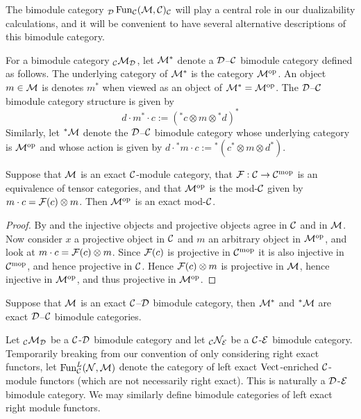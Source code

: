 \documentclass{amsart}
\begin{document}
The bimodule category ${}_\mathcal D \operatorname{Fun}_\mathcal C(\mathcal M,\mathcal C)_\mathcal C$ will play a central role in our dualizability calculations, and it will be convenient to have several alternative descriptions of this bimodule category.

\begin{definition} \label{def:Dual_bimodule_notation}
For a bimodule category ${}_\mathcal C \mathcal M_\mathcal D$, let $\mathcal M^*$ denote a $\mathcal D$--$\mathcal C$ bimodule category defined as follows.  The underlying category of $\mathcal M^*$ is the category $\mathcal M^{\mathrm{op}}$. An object $m \in \mathcal M$ is denotes $m^*$ when viewed as an object of $\mathcal M^* = \mathcal M^{\mathrm{op}}$.  The $\mathcal D$--$\mathcal C$ bimodule category structure is given by
\begin{equation*}
	d\cdot m^* \cdot c := ({}^*c \otimes m \otimes {}^*d)^*
\end{equation*}
Similarly, let ${}^*\mathcal M$ denote the $\mathcal D$--$\mathcal C$ bimodule category whose underlying category is $\mathcal M^{\mathrm{op}}$ and whose action is given by $d\cdot {}^*m \cdot c := {}^*(c^* \otimes m \otimes d^*)$.  
\end{definition}

\begin{lemma}
Suppose that $\mathcal M$ is an exact $\mathcal C$-module category, that $\mathcal F: \mathcal C \rightarrow \mathcal C^{\mathrm{mop}}$ is an equivalence of tensor categories, and that $\mathcal M^{\mathrm{op}}$ is the mod-$\mathcal C$ given by $m \cdot c = \mathcal F(c) \otimes m$.  Then $\mathcal M^{\mathrm{op}}$ is an exact mod-$\mathcal C$.
\end{lemma}
\begin{proof}
By \cite[Prop. 2.3]{MR2119143} and \cite[Corollary 3.6]{MR2119143} the injective objects and projective objects agree in $\mathcal C$ and in $\mathcal M$.  Now consider $x$ a projective object in $\mathcal C$ and $m$ an arbitrary object in $\mathcal M^{\mathrm{op}}$, and look at $m \cdot c = \mathcal F(c) \otimes m$.  Since $\mathcal F(c)$ is projective in $\mathcal C^{\mathrm{mop}}$ it is also injective in $\mathcal C^{\mathrm{mop}}$, and hence projective in $\mathcal C$.  Hence $\mathcal F(c) \otimes m$ is projective in $\mathcal M$, hence injective in $\mathcal M^{\mathrm{op}}$, and thus projective in $\mathcal M^{\mathrm{op}}$.
\end{proof}

\begin{corollary} \label{cor:adjoint-exactness}
Suppose that $\mathcal M$ is an exact $\mathcal C$--$\mathcal D$ bimodule category, then $\mathcal M^*$ and ${}^*\mathcal M$ are exact $\mathcal D$--$\mathcal C$ bimodule categories.
\end{corollary}


\begin{definition}
	Let ${}_{\mathcal C}\mathcal M_\mathcal D$ be a $\mathcal C$-$\mathcal D$ bimodule category and let ${}_{\mathcal C}\mathcal N_\mathcal E$ be a $\mathcal C$-$\mathcal E$ bimodule category. Temporarily breaking from our convention of only considering right exact functors, let	 $\operatorname{Fun}^L_{\mathcal C}(\mathcal N, \mathcal M)$ denote the category of left exact $\mathrm{Vect}$-enriched $\mathcal C$-module functors (which are not necessarily right exact). This is naturally a $\mathcal D$-$\mathcal E$ bimodule category. We may similarly define bimodule categories of left exact right module functors. 
\end{definition}
\end{document}
